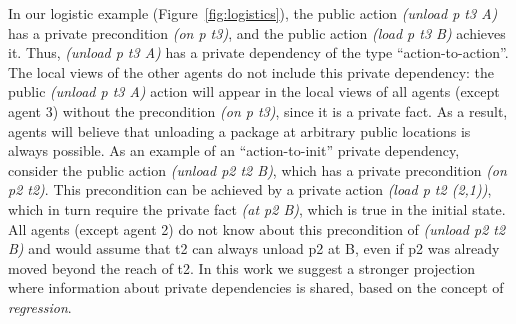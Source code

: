 \documentclass[letterpaper]{article}
\theoremstyle{definition}
\begin{document}

In our logistic example (Figure~\ref{fig:logistics}), the public action {\em (unload p t3 A)} has a private precondition {\em (on p t3)}, 
and the public action {\em (load p t3 B)} achieves it. Thus, {\em (unload p t3 A)} has a private dependency of the type ``action-to-action''. 
The local views of the other agents do not include this private dependency: the public {\em (unload p t3 A)} action 
will appear in the local views of all agents (except agent 3) without the precondition {\em (on p t3)}, since it is a private fact. As a result, agents will believe that unloading a package at arbitrary public locations is always possible. 
As an example of an ``action-to-init'' private dependency, consider the public action {\em (unload p2 t2 B)}, which has a private precondition 
{\em (on p2 t2)}. This precondition can be achieved by a private action {\em (load p t2 (2,1))}, which in turn require the private fact {\em (at p2 B)}, which is true in the initial state. All agents (except agent 2) do not know about this precondition of {\em (unload p2 t2 B)} and would assume that t2 can always unload p2 at B, even if p2 was already moved beyond the reach of t2.
In this work we suggest a stronger projection where information about private dependencies is shared, based on the concept of {\em regression}. %




\end{document}
